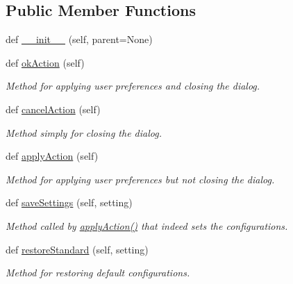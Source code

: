 \subsection*{Public Member Functions}
\begin{DoxyCompactItemize}
\item 
def \hyperlink{classsettings_1_1preferences_1_1_preferences_blade_py_af773a0c74e666c299d2334a21966f8c9}{\+\_\+\+\_\+init\+\_\+\+\_\+} (self, parent=None)
\item 
def \hyperlink{classsettings_1_1preferences_1_1_preferences_blade_py_a7e99113696fefa62dfdeb2ba1279350c}{ok\+Action} (self)
\begin{DoxyCompactList}\small\item\em Method for applying user preferences and closing the dialog. \end{DoxyCompactList}\item 
def \hyperlink{classsettings_1_1preferences_1_1_preferences_blade_py_af92de31fcc110a9892dc2914efb6b46f}{cancel\+Action} (self)
\begin{DoxyCompactList}\small\item\em Method simply for closing the dialog. \end{DoxyCompactList}\item 
def \hyperlink{classsettings_1_1preferences_1_1_preferences_blade_py_a8938a7b43ca7c5496a0ae7bf8d6a0c54}{apply\+Action} (self)
\begin{DoxyCompactList}\small\item\em Method for applying user preferences but not closing the dialog. \end{DoxyCompactList}\item 
def \hyperlink{classsettings_1_1preferences_1_1_preferences_blade_py_a9cfbfd7abab4ba14d80c573a0534040b}{save\+Settings} (self, setting)
\begin{DoxyCompactList}\small\item\em Method called by \hyperlink{classsettings_1_1preferences_1_1_preferences_blade_py_a8938a7b43ca7c5496a0ae7bf8d6a0c54}{apply\+Action()} that indeed sets the configurations. \end{DoxyCompactList}\item 
def \hyperlink{classsettings_1_1preferences_1_1_preferences_blade_py_ab74be9049535f502252efb2df560ac8e}{restore\+Standard} (self, setting)
\begin{DoxyCompactList}\small\item\em Method for restoring default configurations. \end{DoxyCompactList}\end{DoxyCompactItemize}
